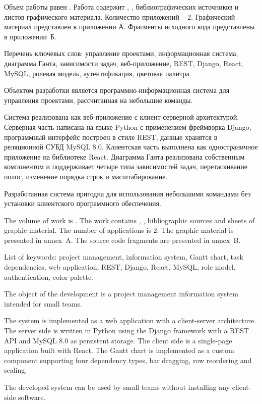 
Объем работы равен . Работа содержит , ,  библиографических источников и  листов графического материала. Количество приложений -- 2. Графический материал представлен в приложении А. Фрагменты исходного кода представлены в приложении~Б.

Перечень ключевых слов: управление проектами, информационная система, диаграмма Ганта, зависимости задач, веб-приложение, REST, Django, React, MySQL, ролевая модель, аутентификация, цветовая палитра.

Объектом разработки является программно-информационная система для управления проектами, рассчитанная на небольшие команды.

Система реализована как веб-приложение с клиент-серверной архитектурой. Серверная часть написана на языке Python с применением фреймворка Django, программный интерфейс построен в стиле REST, данные хранятся в реляционной СУБД MySQL 8.0. Клиентская часть выполнена как одностраничное приложение на библиотеке React. Диаграмма Ганта реализована собственным компонентом и поддерживает четыре типа зависимостей задач, перетаскивание полос, изменение порядка строк и масштабирование.

Разработанная система пригодна для использования небольшими командами без установки клиентского программного обеспечения.


The volume of work is . The work contains , ,  bibliographic sources and  sheets of graphic material. The number of applications is 2. The graphic material is presented in annex~A. The source code fragments are presented in annex~B.

List of keywords: project management, information system, Gantt chart, task dependencies, web application, REST, Django, React, MySQL, role model, authentication, color palette.

The object of the development is a project management information system intended for small teams.

The system is implemented as a web application with a client-server architecture. The server side is written in Python using the Django framework with a REST API and MySQL 8.0 as persistent storage. The client side is a single-page application built with React. The Gantt chart is implemented as a custom component supporting four dependency types, bar dragging, row reordering and scaling.

The developed system can be used by small teams without installing any client-side software.
